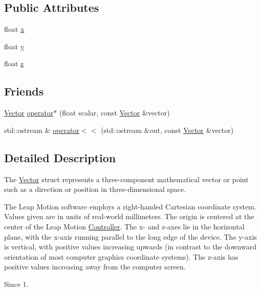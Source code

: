 \subsection*{Public Attributes}
\begin{DoxyCompactItemize}
\item 
float \hyperlink{struct_leap_1_1_vector_a58ab75fe089da2070f5dcef82c9a578a}{x}
\item 
float \hyperlink{struct_leap_1_1_vector_abfff2f5b5c10d58a43cf377fc4cb9951}{y}
\item 
float \hyperlink{struct_leap_1_1_vector_aa44971ce01ce035e78ea557bc1e983a4}{z}
\end{DoxyCompactItemize}
\subsection*{Friends}
\begin{DoxyCompactItemize}
\item 
\hyperlink{struct_leap_1_1_vector}{Vector} \hyperlink{struct_leap_1_1_vector_a90f989718db5a1be59eb472f30e61472}{operator$\ast$} (float scalar, const \hyperlink{struct_leap_1_1_vector}{Vector} \&vector)
\item 
std\+::ostream \& \hyperlink{struct_leap_1_1_vector_ae295e87eb813266c27e75d2809df2acc}{operator$<$$<$} (std\+::ostream \&out, const \hyperlink{struct_leap_1_1_vector}{Vector} \&vector)
\end{DoxyCompactItemize}


\subsection{Detailed Description}
The \hyperlink{struct_leap_1_1_vector}{Vector} struct represents a three-\/component mathematical vector or point such as a direction or position in three-\/dimensional space.

The Leap Motion software employs a right-\/handed Cartesian coordinate system. Values given are in units of real-\/world millimeters. The origin is centered at the center of the Leap Motion \hyperlink{class_leap_1_1_controller}{Controller}. The x-\/ and z-\/axes lie in the horizontal plane, with the x-\/axis running parallel to the long edge of the device. The y-\/axis is vertical, with positive values increasing upwards (in contrast to the downward orientation of most computer graphics coordinate systems). The z-\/axis has positive values increasing away from the computer screen.

 \begin{DoxySince}{Since}
1. 
\end{DoxySince}



